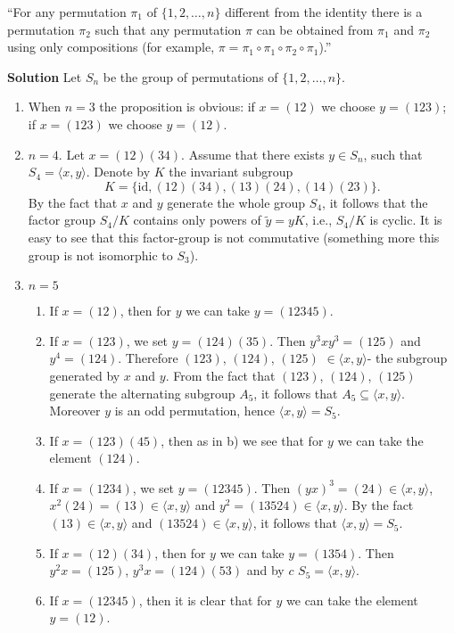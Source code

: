 \documentclass{article}
\begin{document}
``For any permutation \(\pi_1\) of \(\{1,2,\ldots,n\}\)
different from the identity there is a permutation \(\pi_2\)
such that any permutation \(\pi\) can be obtained from \(\pi_1\) and \(\pi_2\)
using only compositions (for example, \(\pi = \pi_1 \circ \pi_1 \circ \pi_2 \circ \pi_1\)).''

\textbf{Solution}
Let \( S_n \) be the group of permutations of \(\{1,2,\ldots,n\}\).
\begin{enumerate}
    \item When \( n = 3 \) the proposition is obvious: if \( x = (12) \) we choose \( y = (123) \); if \( x = (123) \) we choose \( y = (12) \).
    \item \( n = 4 \). Let \( x = (12)(34) \). Assume that there exists \( y \in S_n \), such that \( S_4 = \langle x, y \rangle \). Denote by \( K \) the invariant subgroup
    \[ K = \{\text{id}, (12)(34), (13)(24), (14)(23)\}. \]
    By the fact that \( x \) and \( y \) generate the whole group \( S_4 \), it follows that the factor group \( S_4 / K \) contains only powers of \( \tilde{y} = yK \), i.e., \( S_4 / K \) is cyclic. It is easy to see that this factor-group is not commutative (something more this group is not isomorphic to \( S_3 \)).
    \item \( n = 5 \)
    \begin{enumerate}
        \item If \( x = (12) \), then for \( y \) we can take \( y = (12345) \).
        \item If \( x = (123) \), we set \( y = (124)(35) \). Then \( y^3x y^3 = (125) \) and \( y^4 = (124) \). Therefore \( (123) \), \( (124) \), \( (125) \) \(\in \langle x, y \rangle\)- the subgroup generated by \( x \) and \( y \). From the fact that \( (123) \), \( (124) \), \( (125) \) generate the alternating subgroup \( A_5 \), it follows that \( A_5 \subseteq \langle x, y \rangle \). Moreover \( y \) is an odd permutation, hence \( \langle x, y \rangle = S_5 \).
        \item If \( x = (123)(45) \), then as in b) we see that for \( y \) we can take the element \( (124) \).
        \item If \( x = (1234) \), we set \( y = (12345) \). Then \( (yx)^3 = (24) \in \langle x, y \rangle \), \( x^2(24) = (13) \in \langle x, y \rangle \) and \( y^2 = (13524) \in \langle x, y \rangle \). By the fact \( (13) \in \langle x, y \rangle \) and \( (13524) \in \langle x, y \rangle \), it follows that \( \langle x, y \rangle = S_5 \).
        \item If \( x = (12)(34) \), then for \( y \) we can take \( y = (1354) \). Then \( y^2x = (125) \), \( y^3x = (124)(53) \) and by \( c \) \( S_5 = \langle x, y \rangle \).
        \item If \( x = (12345) \), then it is clear that for \( y \) we can take the element \( y = (12) \).
    \end{enumerate}
\end{enumerate}
\end{document}
